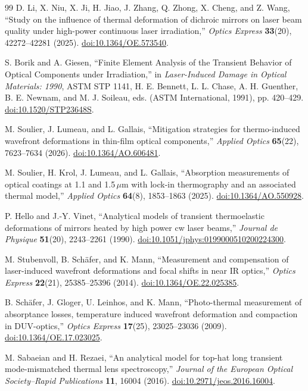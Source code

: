 \begin{thebibliography}{99}
D. Li, X. Niu, X. Ji, H. Jiao, J. Zhang, Q. Zhong, X. Cheng, and Z. Wang,
``Study on the influence of thermal deformation of dichroic mirrors on laser beam quality under high-power continuous laser irradiation,''
\emph{Optics Express} \textbf{33}(20), 42272--42281 (2025).
\href{https://doi.org/10.1364/OE.573540}{doi:10.1364/OE.573540}.

S. Borik and A. Giesen,
``Finite Element Analysis of the Transient Behavior of Optical Components under Irradiation,''
in \emph{Laser-Induced Damage in Optical Materials: 1990}, ASTM STP 1141,
H. E. Bennett, L. L. Chase, A. H. Guenther, B. E. Newnam, and M. J. Soileau, eds.
(ASTM International, 1991), pp. 420--429.
\href{https://doi.org/10.1520/STP23648S}{doi:10.1520/STP23648S}.

M. Soulier, J. Lumeau, and L. Gallais,
``Mitigation strategies for thermo-induced wavefront deformations in thin-film optical components,''
\emph{Applied Optics} \textbf{65}(22), 7623--7634 (2026).
\href{https://doi.org/10.1364/AO.606481}{doi:10.1364/AO.606481}.

M. Soulier, H. Krol, J. Lumeau, and L. Gallais,
``Absorption measurements of optical coatings at 1.1 and 1.5\,\ensuremath{\mu}m with lock-in thermography and an associated thermal model,''
\emph{Applied Optics} \textbf{64}(8), 1853--1863 (2025).
\href{https://doi.org/10.1364/AO.550928}{doi:10.1364/AO.550928}.

P. Hello and J.-Y. Vinet,
``Analytical models of transient thermoelastic deformations of mirrors heated by high power cw laser beams,''
\emph{Journal de Physique} \textbf{51}(20), 2243--2261 (1990).
\href{https://doi.org/10.1051/jphys:0199000510200224300}{doi:10.1051/jphys:0199000510200224300}.

M. Stubenvoll, B. Sch{\"a}fer, and K. Mann,
``Measurement and compensation of laser-induced wavefront deformations and focal shifts in near IR optics,''
\emph{Optics Express} \textbf{22}(21), 25385--25396 (2014).
\href{https://doi.org/10.1364/OE.22.025385}{doi:10.1364/OE.22.025385}.

B. Sch{\"a}fer, J. Gloger, U. Leinhos, and K. Mann,
``Photo-thermal measurement of absorptance losses, temperature induced wavefront deformation and compaction in DUV-optics,''
\emph{Optics Express} \textbf{17}(25), 23025--23036 (2009).
\href{https://doi.org/10.1364/OE.17.023025}{doi:10.1364/OE.17.023025}.

M. Sabaeian and H. Rezaei,
``An analytical model for top-hat long transient mode-mismatched thermal lens spectroscopy,''
\emph{Journal of the European Optical Society--Rapid Publications} \textbf{11}, 16004 (2016).
\href{https://doi.org/10.2971/jeos.2016.16004}{doi:10.2971/jeos.2016.16004}.
\end{thebibliography}
